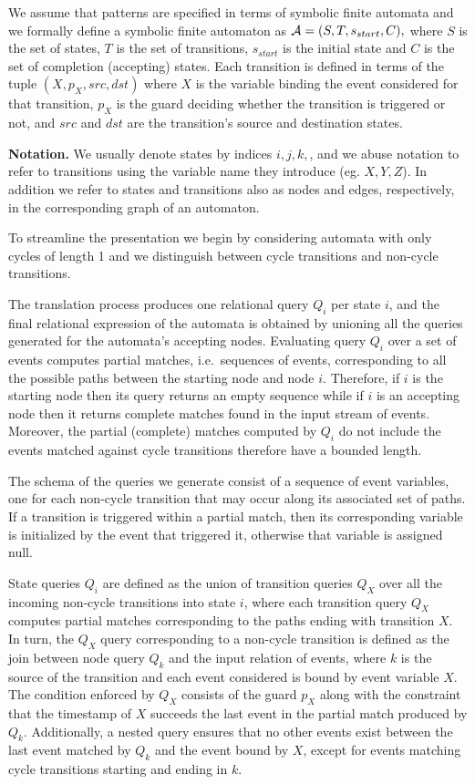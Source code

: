 We assume that patterns are specified in terms of symbolic finite automata and
we formally define a symbolic finite automaton as $\mathcal{A} = (S, T, s_{start}, C),$ 
where $S$ is the set of states, $T$ is the set of transitions, $s_{start}$ is 
the initial state and $C$ is the set of completion (accepting) states.
Each transition is defined in terms of the tuple $(X, p_X, src, dst)$ where $X$ 
is the variable binding the event considered for that transition, $p_X$ is the 
guard deciding whether the transition is triggered or not, and $src$ and $dst$ 
are the transition's source and destination states.

{\bf Notation.}
We usually denote states by indices $i, j, k,$, and we abuse notation to refer 
to transitions using the variable name they introduce (eg. $X, Y, Z$).
In addition we refer to states and transitions also as nodes and edges, 
respectively, in the corresponding graph of an automaton.

To streamline the presentation we begin by considering automata with only
cycles of length 1 and we distinguish between cycle transitions and
non-cycle transitions.


The translation process produces one relational query $Q_i$ per state $i$, and 
the final relational expression of the automata is obtained by unioning all the 
queries generated for the automata's accepting nodes.
Evaluating query $Q_i$ over a set of events computes partial matches, i.e.\ 
sequences of events, corresponding to all the possible paths between the 
starting node and node $i$.
Therefore, if $i$ is the starting node then its query returns an empty sequence 
while if $i$ is an accepting node then it returns complete matches found in the 
input stream of events.
Moreover, the partial (complete) matches computed by $Q_i$ do not include the 
events matched against cycle transitions therefore have a bounded length. 

The schema of the queries we generate consist of a sequence of event variables, 
one for each non-cycle transition that may occur along its associated set of 
paths. 
If a transition is triggered within a partial match, then its corresponding 
variable is initialized by the event that triggered it, otherwise that variable 
is assigned null.


State queries $Q_i$ are defined as the union of transition queries $Q_X$ over 
all the incoming non-cycle transitions into state $i$, where each transition 
query $Q_X$ computes partial matches corresponding to the paths ending with 
transition $X$.
In turn, the $Q_X$ query corresponding to a non-cycle transition is defined as 
the join between node query $Q_k$ and the input relation of events, where $k$ 
is the source of the transition and each event considered is bound by event 
variable $X$.
The condition enforced by $Q_X$ consists of the guard $p_X$ along with the 
constraint that the timestamp of $X$ succeeds the last event in the partial 
match produced by $Q_k$.
Additionally, a nested query ensures that no other events 
exist between the last event matched by $Q_k$ and the event bound by $X$, 
except for events matching cycle transitions starting and ending in $k$.


